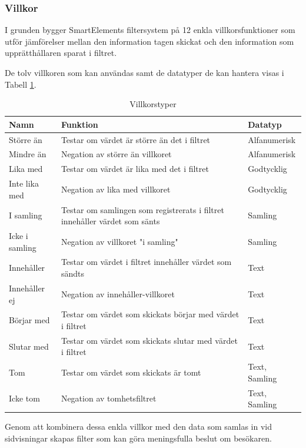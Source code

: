 \subsubsection{Villkor}

I grunden bygger SmartElements filtersystem på 12 enkla villkorsfunktioner som utför jämförelser mellan den information tagen skickat och den information som upprätthållaren sparat i filtret.

De tolv villkoren som kan användas samt de datatyper de kan hantera visas i Tabell \ref{table:villkor}.

\begin{table}
    \begin{tabular}{|l|p{8cm}|l|}
    \hline
    Namn & Funktion & Datatyp \\
    \hline
    Större än & Testar om värdet är större än det i filtret & Alfanumerisk \\
    \hline
    Mindre än & Negation av större än villkoret & Alfanumerisk \\
    \hline
    Lika med & Testar om värdet är lika med det i filtret & Godtycklig \\
    \hline
    Inte lika med & Negation av lika med villkoret & Godtycklig \\
    \hline
    I samling & Testar om samlingen som registrerats i filtret innehåller värdet som sänts & Samling \\
    \hline
    Icke i samling & Negation av villkoret "i samling" & Samling \\
    \hline
    Innehåller & Testar om värdet i filtret innehåller värdet som sändts & Text \\
    \hline
    Innehåller ej & Negation av innehåller-villkoret & Text \\
    \hline
    Börjar med & Testar om värdet som skickats börjar med värdet i filtret & Text \\
    \hline
    Slutar med & Testar om värdet som skickats slutar med värdet i filtret & Text \\
    \hline
    Tom & Testar om värdet som skickats är tomt & Text, Samling \\
    \hline
    Icke tom & Negation av tomhetsfiltret & Text, Samling \\
    \hline
    \end{tabular}
    \caption{Villkorstyper}
    \label{table:villkor}
\end{table}

Genom att kombinera dessa enkla villkor med den data som samlas in vid sidvisningar skapas filter som kan göra meningsfulla beslut om besökaren.

